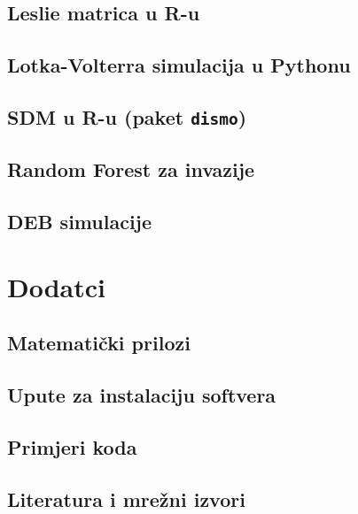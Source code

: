 \documentclass[12pt,a4paper]{book}
\begin{document}
	\section{Leslie matrica u R-u}
	\section{Lotka-Volterra simulacija u Pythonu}
	\section{SDM u R-u (paket \texttt{dismo})}
	\section{Random Forest za invazije}
	\section{DEB simulacije}
	
	\appendix
	\chapter{Dodatci}
	\section{Matematički prilozi}
	\section{Upute za instalaciju softvera}
	\section{Primjeri koda}
	\section{Literatura i mrežni izvori}
	
\end{document}
